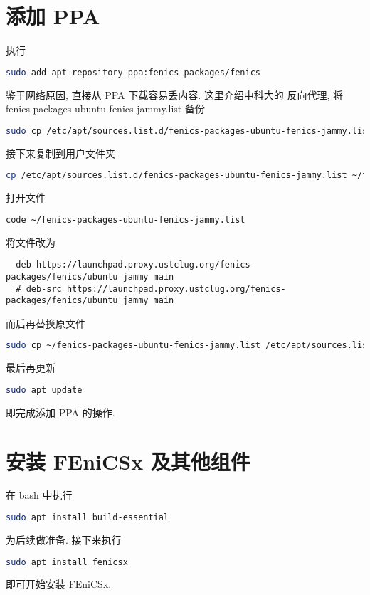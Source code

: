 \documentclass[fontset=founder]{ctexrep}
\begin{document}
\section{添加 PPA}

执行
\begin{lstlisting}[language = bash]
  sudo add-apt-repository ppa:fenics-packages/fenics
\end{lstlisting}
鉴于网络原因,
直接从 PPA 下载容易丢内容.
这里介绍中科大的%
\href{https://mirrors.ustc.edu.cn/}{反向代理},
将 \textsf{fenics-packages-ubuntu-fenics-jammy.list} 备份
\begin{lstlisting}[language = bash]
  sudo cp /etc/apt/sources.list.d/fenics-packages-ubuntu-fenics-jammy.list /etc/apt/sources.list.d/fenics-packages-ubuntu-fenics-jammy.list.bak
\end{lstlisting}
接下来复制到用户文件夹
\begin{lstlisting}[language = bash]
  cp /etc/apt/sources.list.d/fenics-packages-ubuntu-fenics-jammy.list ~/fenics-packages-ubuntu-fenics-jammy.list
\end{lstlisting}
打开文件
\begin{lstlisting}[language = bash]
  code ~/fenics-packages-ubuntu-fenics-jammy.list
\end{lstlisting}
将文件改为
\begin{lstlisting}
  deb https://launchpad.proxy.ustclug.org/fenics-packages/fenics/ubuntu jammy main
  # deb-src https://launchpad.proxy.ustclug.org/fenics-packages/fenics/ubuntu jammy main
\end{lstlisting}
而后再替换原文件
\begin{lstlisting}[language = bash]
  sudo cp ~/fenics-packages-ubuntu-fenics-jammy.list /etc/apt/sources.list.d/fenics-packages-ubuntu-fenics-jammy.list
\end{lstlisting}
最后再更新
\begin{lstlisting}[language = bash]
  sudo apt update
\end{lstlisting}
即完成添加 PPA 的操作.

\section{安装 FEniCSx 及其他组件}

在 \textsf{bash} 中执行
\begin{lstlisting}[language = bash]
  sudo apt install build-essential
\end{lstlisting}
为后续做准备.
接下来执行
\begin{lstlisting}[language = bash]
  sudo apt install fenicsx
\end{lstlisting}
即可开始安装 FEniCSx.
\end{document}
